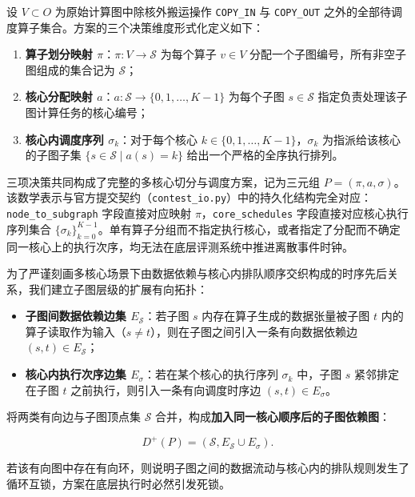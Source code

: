 \documentclass[anonymous,notoc]{gmcm2026}
\providecommand{\tightlist}{\setlength{\itemsep}{0pt}\setlength{\parskip}{0pt}}
\begin{document}
设 \(V \subset O\) 为原始计算图中除核外搬运操作 \texttt{COPY\_IN} 与 \texttt{COPY\_OUT} 之外的全部待调度算子集合。方案的三个决策维度形式化定义如下：

\begin{enumerate}
\def\labelenumi{\arabic{enumi}.}
\tightlist
\item
  \textbf{算子划分映射 \(\pi\)}：\(\pi: V \to \mathcal{S}\) 为每个算子 \(v \in V\) 分配一个子图编号，所有非空子图组成的集合记为 \(\mathcal{S}\)；
\item
  \textbf{核心分配映射 \(a\)}：\(a: \mathcal{S} \to \{0, 1, \dots, K-1\}\) 为每个子图 \(s \in \mathcal{S}\) 指定负责处理该子图计算任务的核心编号；
\item
  \textbf{核心内调度序列 \(\sigma_k\)}：对于每个核心 \(k \in \{0, 1, \dots, K-1\}\)，\(\sigma_k\) 为指派给该核心的子图子集 \(\{s \in \mathcal{S} \mid a(s) = k\}\) 给出一个严格的全序执行排列。
\end{enumerate}

三项决策共同构成了完整的多核心切分与调度方案，记为三元组 \(P = (\pi, a, \sigma)\)。该数学表示与官方提交契约（\texttt{contest\_io.py}）中的持久化结构完全对应：\texttt{node\_to\_subgraph} 字段直接对应映射 \(\pi\)，\texttt{core\_schedules} 字段直接对应核心执行序列集合 \(\{\sigma_k\}_{k=0}^{K-1}\)。单有算子分组而不指定执行核心，或者指定了分配而不确定同一核心上的执行次序，均无法在底层评测系统中推进离散事件时钟。

为了严谨刻画多核心场景下由数据依赖与核心内排队顺序交织构成的时序先后关系，我们建立子图层级的扩展有向拓扑：

\begin{itemize}
\tightlist
\item
  \textbf{子图间数据依赖边集 \(E_{\mathcal{S}}\)}：若子图 \(s\) 内存在算子生成的数据张量被子图 \(t\) 内的算子读取作为输入（\(s \ne t\)），则在子图之间引入一条有向数据依赖边 \((s, t) \in E_{\mathcal{S}}\)；
\item
  \textbf{核心内执行次序边集 \(E_\sigma\)}：若在某个核心的执行序列 \(\sigma_k\) 中，子图 \(s\) 紧邻排定在子图 \(t\) 之前执行，则引入一条有向调度时序边 \((s, t) \in E_\sigma\)。
\end{itemize}

将两类有向边与子图顶点集 \(\mathcal{S}\) 合并，构成\textbf{加入同一核心顺序后的子图依赖图}：

\[D^+(P) = (\mathcal{S}, E_{\mathcal{S}} \cup E_\sigma).\]

若该有向图中存在有向环，则说明子图之间的数据流动与核心内的排队规则发生了循环互锁，方案在底层执行时必然引发死锁。
\end{document}
